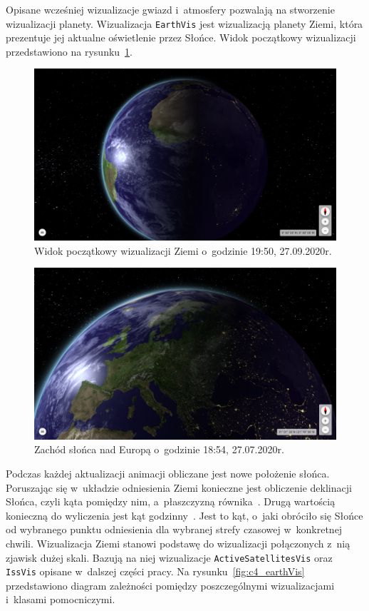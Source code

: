 Opisane wcześniej wizualizacje gwiazd i~atmosfery pozwalają na stworzenie wizualizacji planety. Wizualizacja \texttt{EarthVis} jest wizualizacją planety Ziemi, która prezentuje jej aktualne oświetlenie przez Słońce. Widok początkowy wizualizacji przedstawiono na rysunku~\ref{fig:c4_earthVis_1}. 


\begin{figure}[h]
  \centering
  \includegraphics[width=\linewidth]{img/c4_earthVis_1.png}
  \caption{Widok początkowy wizualizacji Ziemi o~godzinie 19:50, 27.09.2020r.}
  \label{fig:c4_earthVis_1} 
\end{figure}
  

\begin{figure}[h]
  \centering
  \includegraphics[width=\linewidth]{img/c4_earthVis_2.png}
  \caption{Zachód słońca nad Europą o~godzinie 18:54, 27.07.2020r.}
  \label{fig:c4_earthVis_2} 
\end{figure}
  
Podczas każdej aktualizacji animacji obliczane jest nowe położenie słońca. Poruszając się w~układzie odniesienia Ziemi konieczne jest obliczenie deklinacji Słońca, czyli kąta pomiędzy nim, a~płaszczyzną równika~\cite{Declination}. Drugą wartością konieczną do wyliczenia jest kąt godzinny~\cite{SolarTime}. Jest to kąt, o~jaki obróciło się Słońce od wybranego punktu odniesienia dla wybranej strefy czasowej w~konkretnej chwili. Wizualizacja Ziemi stanowi podstawę do wizualizacji połączonych z~nią zjawisk dużej skali. Bazują na niej wizualizacje \texttt{ActiveSatellitesVis} oraz \texttt{IssVis} opisane w~dalszej części pracy. Na rysunku~\ref{fig:c4_earthVis} przedstawiono diagram zależności pomiędzy poszczególnymi wizualizacjami i~klasami pomocniczymi.

